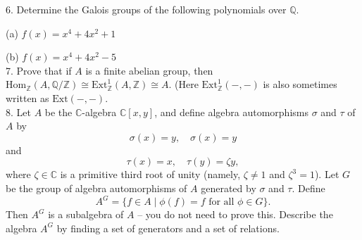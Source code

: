 \documentclass[11pt]{article}
\newcommand{\Z}{\mathbb{Z}}
\newcommand{\Q}{\mathbb{Q}}
\newcommand{\C}{\mathbb{C}}
\begin{document}
6. Determine the Galois groups of the following polynomials over $\Q$.

(a) $f(x) = x^4+4x^2+1$

(b) $f(x) = x^4 +4x^2 -5$\\

7. Prove that if $A$ is a finite abelian group, then $\mbox{Hom}_\Z(A,\Q/\Z)\cong \mbox{Ext}_\Z^1(A,\Z) \cong A$. (Here $\mbox{Ext}_\Z^1(-,-)$ is also sometimes written as $\mbox{Ext}(-,-)$. \\

8. Let $A$ be the $\C$-algebra $\C[x,y]$, and define algebra automorphisms $\sigma$ and $\tau$ of $A$ by \[
\sigma(x)= y, \quad \sigma(x) = y
\]
and \[
\tau(x) = x,\quad \tau(y) = \zeta y,
\]
where $\zeta\in \C$ is a primitive third root of unity (namely, $\zeta \neq 1$ and $\zeta^3 = 1$). Let $G$ be the group of algebra automorphisms of $A$ generated by $\sigma$ and $\tau$. Define \[
A^G = \{f\in A \mid \phi(f) = f\text{ for all } \phi\in G\}.
\]
Then $A^G$ is a subalgebra of $A$ -- you do not need to prove this. Describe the algebra $A^G$ by finding a set of generators and a set of relations. 
\end{document}
